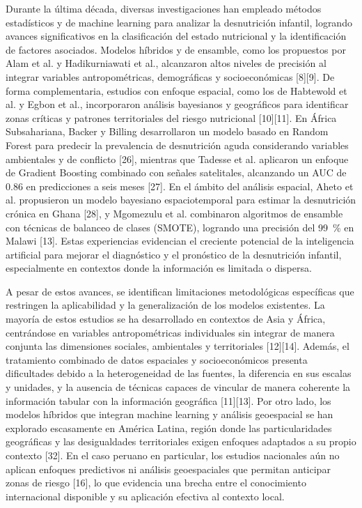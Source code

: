 \documentclass[final,5p,times,twocolumn,authoryear,lefttitle]{elsarticle}
\begin{document}
Durante la última década, diversas investigaciones han empleado métodos estadísticos y de machine learning para analizar la desnutrición infantil, logrando avances significativos en la clasificación del estado nutricional y la identificación de factores asociados. Modelos híbridos y de ensamble, como los propuestos por Alam et al. y Hadikurniawati et al., alcanzaron altos niveles de precisión al integrar variables antropométricas, demográficas y socioeconómicas [8][9]. De forma complementaria, estudios con enfoque espacial, como los de Habtewold et al. y Egbon et al., incorporaron análisis bayesianos y geográficos para identificar zonas críticas y patrones territoriales del riesgo nutricional [10][11]. En África Subsahariana, Backer y Billing desarrollaron un modelo basado en Random Forest para predecir la prevalencia de desnutrición aguda considerando variables ambientales y de conflicto [26], mientras que Tadesse et al. aplicaron un enfoque de Gradient Boosting combinado con señales satelitales, alcanzando un AUC de 0.86 en predicciones a seis meses [27]. En el ámbito del análisis espacial, Aheto et al. propusieron un modelo bayesiano espaciotemporal para estimar la desnutrición crónica en Ghana [28], y Mgomezulu et al. combinaron algoritmos de ensamble con técnicas de balanceo de clases (SMOTE), logrando una precisión del 99~\% en Malawi [13]. Estas experiencias evidencian el creciente potencial de la inteligencia artificial para mejorar el diagnóstico y el pronóstico de la desnutrición infantil, especialmente en contextos donde la información es limitada o dispersa.

A pesar de estos avances, se identifican limitaciones metodológicas específicas que restringen la aplicabilidad y la generalización de los modelos existentes. La mayoría de estos estudios se ha desarrollado en contextos de Asia y África, centrándose en variables antropométricas individuales sin integrar de manera conjunta las dimensiones sociales, ambientales y territoriales [12][14]. Además, el tratamiento combinado de datos espaciales y socioeconómicos presenta dificultades debido a la heterogeneidad de las fuentes, la diferencia en sus escalas y unidades, y la ausencia de técnicas capaces de vincular de manera coherente la información tabular con la información geográfica [11][13]. Por otro lado, los modelos híbridos que integran machine learning y análisis geoespacial se han explorado escasamente en América Latina, región donde las particularidades geográficas y las desigualdades territoriales exigen enfoques adaptados a su propio contexto [32]. En el caso peruano en particular, los estudios nacionales aún no aplican enfoques predictivos ni análisis geoespaciales que permitan anticipar zonas de riesgo [16], lo que evidencia una brecha entre el conocimiento internacional disponible y su aplicación efectiva al contexto local.
\end{document}
